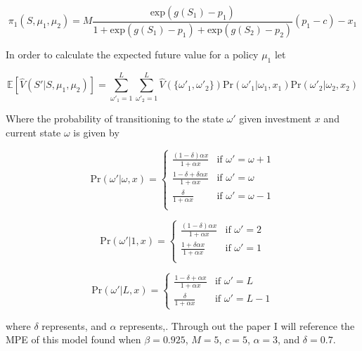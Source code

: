 \documentclass[12pt]{article}
\begin{document}
\begin{equation*}
  \pi_1(S,\mu_{1},\mu_{2})=M \frac{\text{exp}(g(S_1)-p_1)}{1+\text{exp}(g(S_1)-p_1)+\text{exp}(g(S_2)-p_2)} (p_1-c)-x_1
\end{equation*}

In order to calculate the expected future value for a policy $\mu_1$ let

\begin{equation*}
  \mathbb{E}[\hat{V}(S'|S,\mu_{1},\mu_{2})] = \sum_{\omega'_1=1}^L \sum_{\omega'_2=1}^L \hat{V}(\{\omega'_1,\omega'_2\}) \text{Pr}(\omega'_1|\omega_1,x_{1}) \text{Pr}(\omega'_2|\omega_2,x_{2})
\end{equation*}

Where the probability of transitioning to the state $\omega'$ given investment $x$ and current state $\omega$ is given by

\begin{equation*}
  \text{Pr}(\omega'|\omega,x) =
  \begin{cases}
    \frac{(1-\delta) \alpha x}{1+\alpha x} & \text{if } \omega'=\omega+1\\
    \frac{1-\delta+\delta \alpha x}{1+\alpha x} & \text{if } \omega' = \omega\\
    \frac{\delta}{1+\alpha x} & \text{if } \omega' = \omega-1\\
  \end{cases}
\end{equation*}

\begin{equation*}
  \text{Pr}(\omega'|1,x) =
  \begin{cases}
    \frac{(1-\delta) \alpha x}{1+\alpha x} & \text{if } \omega'=2\\
    \frac{1+\delta \alpha x}{1+\alpha x} & \text{if } \omega'=1\\
  \end{cases}
\end{equation*}

\begin{equation*}
  \text{Pr}(\omega'|L,x) =
  \begin{cases}
    \frac{1-\delta+\alpha x}{1+\alpha x} & \text{if } \omega'=L\\
    \frac{\delta}{1+\alpha x} & \text{if } \omega'=L-1
  \end{cases}
\end{equation*}

where $\delta$ represents, and $\alpha$ represents,. Through out the paper I will reference the MPE of this model found when $\beta=0.925$, $M=5$, $c=5$, $\alpha=3$, and $\delta=0.7$.
\end{document}
